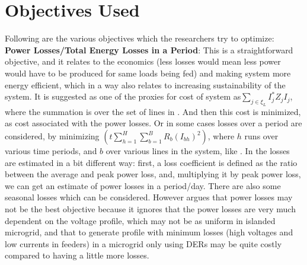 \section{Objectives Used} \label{sec:obj}
Following are the various objectives which the researchers try to optimize:\\
\textbf{Power Losses/Total Energy Losses in a Period}: This is a straightforward objective, and it relates to the economics (less losses would mean less power would have to be produced for same loads being fed) and making system more energy efficient, which in a way also relates to increasing sustainability of the system. It is suggested as one of the proxies for cost of system as$\sum\limits_{j\in \xi_L} I_{j}^*Z_{j}I_{j}$, where the summation is over the set of lines in \citep{mgrj02}. And then this cost is minimized, as cost associated with the power losses. Or in some cases losses over a period are considered, by minimizing $\left(t\sum\limits_{h=1}^H\sum\limits_{b=1}^BR_b\left(I_{bh}\right)^2\right)$, where $h$ runs over various time periods, and $b$ over various lines in the system, like \citep{mgrj52}. In \citep{mgrj51} the losses are estimated in a bit different way: first, a loss coefficient is defined as the ratio between the average and peak power loss, and, multiplying it by peak power loss, we can get an estimate of power losses in a period/day. There are also some seasonal losses which can be considered. However \citep{mgrj04} argues that power losses may not be the best objective because it ignores that the power losses are very much dependent on the voltage profile, which may not be as uniform in islanded microgrid, and that to generate profile with minimum losses (high voltages and low currents in feeders) in a microgrid only using DERs may be quite costly compared to having a little more losses.\\
